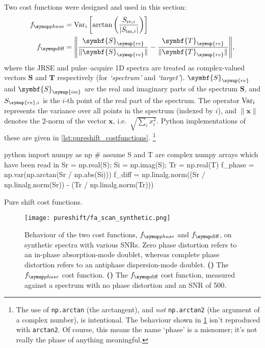 Two cost functions were designed and used in this section:
\begin{align}
    \fphase &= \Var_i\left[\arctan\left(\frac{S_{\text{re},i}}{|S_{\text{im},i}|}\right)\right] \label{eq:ps_cf_phase} \\
    \fdiff &= \Biggl\lVert \frac{\symbf{S}_{\symup{re}}}{\lVert \symbf{S}_{\symup{re}} \rVert} - \frac{\symbf{T}_{\symup{re}}}{\lVert \symbf{T}_{\symup{re}} \rVert} \Biggr\rVert, \label{eq:ps_cf_diff}
\end{align}
where the JRSE and pulse--acquire 1D spectra are treated as complex-valued vectors $\symbf{S}$ and $\symbf{T}$ respectively (for \textit{`spectrum'} and \textit{`target'}). $\symbf{S}_{\symup{re}}$ and $\symbf{S}_{\symup{im}}$ are the real and imaginary parts of the spectrum $\symbf{S}$, and $S_{\symup{re},i}$ is the $i$-th point of the real part of the spectrum.
The operator $\operatorname{Var}_i$ represents the variance over all points in the spectrum (indexed by $i$), and $\lVert \symbf{x} \rVert$ denotes the 2-norm of the vector $\symbf{x}$, i.e.\ $\sqrt{\sum_i x_i^2}$.
Python implementations of these are given in \cref{lst:pureshift_costfunctions}.%
\footnote{The use of \texttt{np.arctan} (the arctangent), and \textit{not} \texttt{np.arctan2} (the argument of a complex number), is intentional. The behaviour shown in \cref{fig:fa_scan_synthetic} isn't reproduced with \texttt{arctan2}. Of course, this means the name `phase' is a misnomer; it's not really the phase of anything meaningful.}

\begin{mylisting}[htb]
\begin{tcbminted}{python}
import numpy as np
# assume S and T are complex numpy arrays which have been read in
Sr = np.real(S); Si = np.imag(S); Tr = np.real(T)
f_phase = np.var(np.arctan(Sr / np.abs(Si)))
f_diff = np.linalg.norm((Sr / np.linalg.norm(Sr))
                        - (Tr / np.linalg.norm(Tr)))
\end{tcbminted}
    \caption[Pure shift cost functions]{Pure shift cost functions.}
    \label{lst:pureshift_costfunctions}
\end{mylisting}

\begin{figure}[htb]
    \centering
    \texttt{[image: pureshift/fa\_scan\_synthetic.png]}%
    {\label{fig:fa_scan_synthetic_fphase}}%
    {\label{fig:fa_scan_synthetic_fdiff}}%
    \caption[Evaluation of $\fphase$ and $\fdiff$ cost functions on synthetic data]{
        Behaviour of the two cost functions, $\fphase$ and $\fdiff$, on synthetic spectra with various SNRs.
        Zero phase distortion refers to an in-phase absorption-mode doublet, whereas complete phase distortion refers to an antiphase dispersion-mode doublet.
        \textbf{()} The $\fphase$ cost function.
        \textbf{()} The $\fdiff$ cost function, measured against a spectrum with no phase distortion and an SNR of 500.
    }
    \label{fig:fa_scan_synthetic}
\end{figure}


